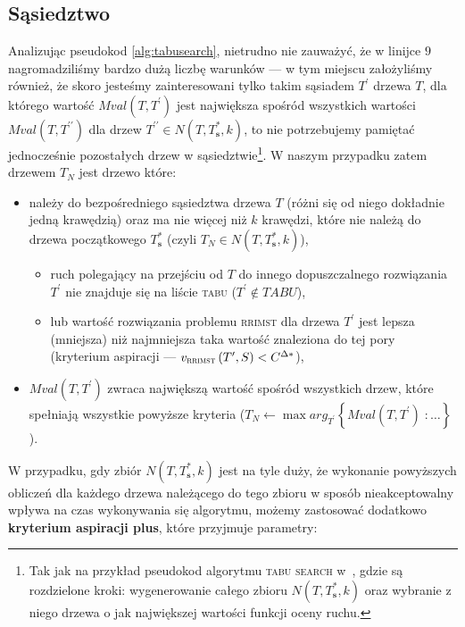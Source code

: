 \subsection{Sąsiedztwo}

Analizując pseudokod \ref{alg:tabusearch}, nietrudno nie zauważyć, że w linijce $9$ nagromadziliśmy bardzo dużą liczbę warunków --- w tym miejscu założyliśmy również, że skoro jesteśmy zainteresowani tylko takim sąsiadem $T^{\prime}$ drzewa $T$, dla którego wartość $Mval \left( T, T^{\prime} \right)$ jest największa spośród wszystkich wartości $Mval \left( T, T^{\prime\prime} \right)$ dla drzew $T^{\prime\prime} \in N \left( T, T^{\ast}_{\textbf{s}}, k \right)$, to nie potrzebujemy pamiętać jednocześnie pozostałych drzew w sąsiedztwie\footnote{Tak jak na przykład pseudokod algorytmu \textsc{tabu search} w~\cite{Kasperski2012}, gdzie są rozdzielone kroki: wygenerowanie całego zbioru $N \left( T, T^{\ast}_{\textbf{s}}, k \right)$ oraz wybranie z niego drzewa o jak największej wartości funkcji oceny ruchu.}. W naszym przypadku zatem drzewem $T_{N}$ jest drzewo które:

\begin{itemize}
	\item należy do bezpośredniego sąsiedztwa drzewa $T$ (różni się od niego dokładnie jedną krawędzią) oraz ma nie więcej niż $k$ krawędzi, które nie należą do drzewa początkowego $T^{\ast}_{\textbf{s}}$ (czyli $T_{N} \in N \left( T, T^{\ast}_{\textbf{s}}, k \right)$),
	\begin{itemize}
		\item ruch polegający na przejściu od $T$ do innego dopuszczalnego rozwiązania $T^{\prime}$ nie znajduje się na liście \textsc{tabu} ($T^{\prime} \notin TABU$),
		\item lub wartość rozwiązania problemu \textsc{rrimst} dla drzewa $T^{\prime}$ jest lepsza (mniejsza) niż najmniejsza taka wartość znaleziona do tej pory (kryterium aspiracji --- $v_{\textsc{rrimst}} \left( T^{\prime}, S \right) < C^{\Delta\ast}$), 
	\end{itemize}
	\item $Mval \left( T, T^{\prime} \right)$ zwraca największą wartość spośród wszystkich drzew, które spełniają wszystkie powyższe kryteria ($T_{N} \leftarrow \max arg_{T^{\prime}} \left\{ Mval \left( T, T^{\prime} \right) \; : \dots \right\}$).
\end{itemize}

W przypadku, gdy zbiór $N \left( T, T^{\ast}_{\textbf{s}}, k \right)$ jest na tyle duży, że wykonanie powyższych obliczeń dla każdego drzewa należącego do tego zbioru w sposób nieakceptowalny wpływa na czas wykonywania się algorytmu, możemy zastosować dodatkowo \textbf{kryterium aspiracji plus}, które przyjmuje parametry:

